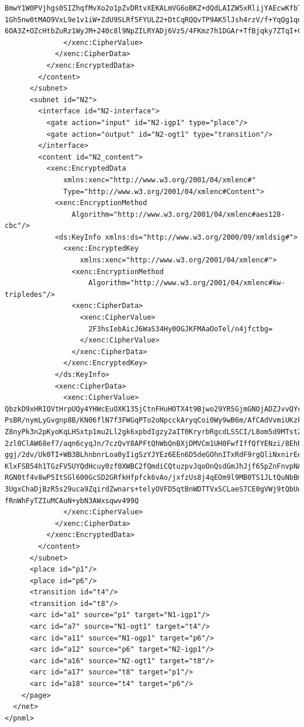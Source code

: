 \begin{lstlisting}
BmwY1W0PVjhgs0SIZhqfMvXo2o1pZvDRtvXEKALmVG6oBKZ+dQdLAIZW5xRlijYAEcwKfbTxosxE
1Gh5nw0tMAO9VxL9e1v1iW+ZdU9SLRf5FYULZ2+DtCqRQQvTP9AK5lJsh4rzV/f+YqQg1qq5IpMO
6OA3Z+OZcHtbZuRz1WyJM+240c8l9NpZILRYADj6Vz5/4FKmz7h1DGAr+TfBjqky7ZTqI+CzGQ==
              </xenc:CipherValue>
            </xenc:CipherData>
          </xenc:EncryptedData>
        </content>
      </subnet>
      <subnet id="N2">
        <interface id="N2-interface">
          <gate action="input" id="N2-igp1" type="place"/>
          <gate action="output" id="N2-ogt1" type="transition"/>
        </interface>
        <content id="N2_content">
          <xenc:EncryptedData 
              xmlns:xenc="http://www.w3.org/2001/04/xmlenc#" 
              Type="http://www.w3.org/2001/04/xmlenc#Content">
            <xenc:EncryptionMethod 
                Algorithm="http://www.w3.org/2001/04/xmlenc#aes128-cbc"/>
            <ds:KeyInfo xmlns:ds="http://www.w3.org/2000/09/xmldsig#">
              <xenc:EncryptedKey 
                  xmlns:xenc="http://www.w3.org/2001/04/xmlenc#">
                <xenc:EncryptionMethod 
                    Algorithm="http://www.w3.org/2001/04/xmlenc#kw-tripledes"/>
                <xenc:CipherData>
                  <xenc:CipherValue>
                    2F3hsIebAicJ6WaS34Hy0OGJKFMAaOoTel/n4jfctbg=
                  </xenc:CipherValue>
                </xenc:CipherData>
              </xenc:EncryptedKey>
            </ds:KeyInfo>
            <xenc:CipherData>
              <xenc:CipherValue>
QbzkD9xHRIQVtHrpUQy4YHWcEuOXK135jCtnFHuHOTX4t9Bjwo29YR5GjmGNOjADZJvvQYcXasC3
PsBR/nymLyGvgnp8B/KN06flN7f3FWGqPTo2oNpcckAryqCoi0Wy9wB6m/AfCAdVvmiUKzktEmLJ
Z8nyPk3n2pKyoKqLHSxtp1mu2Ll2gk6xpbdIgzy2aIT0KryrbRgcdLSSCI/L8om5d9MTstZGWVdr
2zl0ClAW68ef7/aqn6cyqJn/7czQvY8APFtQhWbQnBXjDMVCm1UH0FwfIffQfYENzi/8EhPB266P
ggj/2dv/Uk0TI+WB3BLhnbnrLoa0yIigSzYJYEz6EEn6D5deGOhnITxRdF9rgQliNxnirEeb+9ki
KlxFSB54h1TGzFV5UYQdHcuy0zf0XWBC2fQmdiCQtuzpvJqoOnQsdGmJhJjf65pZnFnvpNAPQF+S
RGN0tf4v8wP5ItSGl600GcSD2GRfkHfpfck6vAo/jxfzUs8j4qEOm9l9MB0TS1JLtQuNbBmTFTRz
3UgxChaDjBzR5s29uca9ZqirdZwnars+telyOVFD5qtBnWDTTVxSCLaeS7CE0gVWj9tQbUq7yqPK
fRnWhFyTZIuMCAuN+ybN3AWxsqwv499Q
              </xenc:CipherValue>
            </xenc:CipherData>
          </xenc:EncryptedData>
        </content>
      </subnet>
      <place id="p1"/>
      <place id="p6"/>
      <transition id="t4"/>
      <transition id="t8"/>
      <arc id="a1" source="p1" target="N1-igp1"/>
      <arc id="a7" source="N1-ogt1" target="t4"/>
      <arc id="a11" source="N1-ogp1" target="p6"/>
      <arc id="a12" source="p6" target="N2-igp1"/>
      <arc id="a16" source="N2-ogt1" target="t8"/>
      <arc id="a17" source="t8" target="p1"/>
      <arc id="a18" source="t4" target="p6"/>
    </page>
  </net>
</pnml>
\end{lstlisting}

